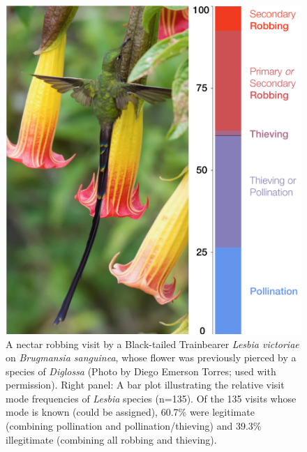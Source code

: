 \documentclass[fleqn,10pt,lineno]{wlpeerj}
\providecommand{\DIFaddbeginFL}{} %
\providecommand{\DIFaddendFL}{} %
\providecommand{\DIFdelbeginFL}{} %
\providecommand{\DIFdelendFL}{} %
\begin{document}


\begin{figure}[ht]
\centering
\DIFdelbeginFL %
\DIFdelendFL \DIFaddbeginFL \includegraphics[width=1\textwidth]{fig1/marauding_lesbias_fig_1b.pdf}
\DIFaddendFL \caption{A nectar robbing visit by a Black-tailed Trainbearer \textit{Lesbia victoriae} on \textit{Brugmansia sanguinea}, whose flower was previously pierced by a species of \textit{Diglossa} (Photo by Diego Emerson Torres; used with permission). Right panel: A bar plot illustrating the relative visit mode frequencies of \textit{Lesbia} species (n=135). Of the 135 visits whose mode is known (could be assigned), 60.7\% were legitimate (combining pollination and pollination/thieving) and 39.3\% illegitimate (combining all robbing and thieving).}
\label{fig:fig1}
\end{figure}

\pagebreak
\end{document}
